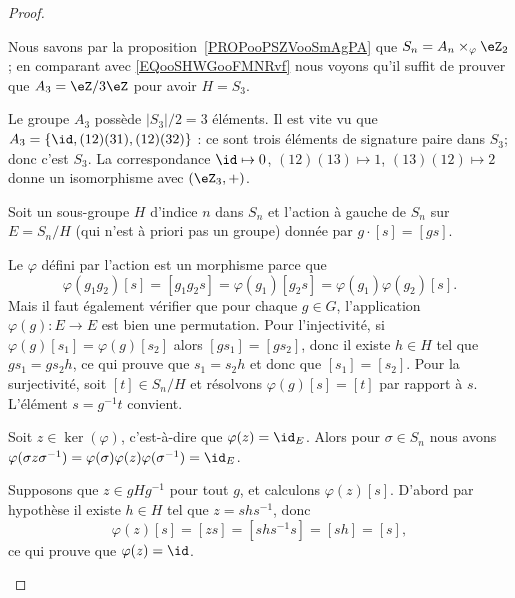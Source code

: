 \begin{proof}
\begin{subproof}
		Nous savons par la proposition~\ref{PROPooPSZVooSmAgPA} que \( S_n=A_n\times_{\varphi}\eZ_2\); en comparant avec \eqref{EQooSHWGooFMNRvf} nous voyons qu'il suffit de prouver que \( A_3=\eZ/3\eZ\) pour avoir \( H=S_3\).

		Le groupe \( A_3\) possède \( | S_3 |/2=3\) éléments. Il est vite vu que \( A_3=\{ \id,(12)(31), (12)(32) \}\) : ce sont trois éléments de signature paire dans \( S_3\); donc c'est \( S_3\). La correspondance \( \id\mapsto 0\), \( (12)(13)\mapsto 1\), \( (13)(12)\mapsto 2\) donne un isomorphisme avec \( (\eZ_3,+)\).


		Soit un sous-groupe \( H\) d'indice \( n\) dans \( S_n\) et l'action à gauche de \( S_n\) sur \( E=S_n/H\) (qui n'est à priori pas un groupe) donnée par \( g\cdot [s]=[gs]\).

		\begin{subproof}

			Le \( \varphi\) défini par l'action est un morphisme parce que
			\begin{equation}
				\varphi(g_1g_2)[s]=[g_1g_2s]=\varphi(g_1)[g_2s]=\varphi(g_1)\varphi(g_2)[s].
			\end{equation}
			Mais il faut également vérifier que pour chaque \( g\in G\), l'application \( \varphi(g)\colon E\to E\) est bien une permutation. Pour l'injectivité, si \( \varphi(g)[s_1]=\varphi(g)[s_2]\) alors \( [gs_1]=[gs_2]\), donc il existe \( h\in H\) tel que \( gs_1=gs_2h\), ce qui prouve que \( s_1=s_2h\) et donc que \( [s_1]=[s_2]\). Pour la surjectivité, soit \( [t]\in S_n/H\) et résolvons \( \varphi(g)[s]=[t]\) par rapport à \( s\). L'élément \( s=g^{-1} t\) convient.


			Soit \( z\in\ker(\varphi)\), c'est-à-dire que \( \varphi(z)=\id_E\). Alors pour \( \sigma\in S_n\) nous avons \( \varphi(\sigma z\sigma^{-1})=\varphi(\sigma)\varphi(z)\varphi(\sigma^{-1})=\id_E\).

			\spitem[\( \ker(\varphi)=\bigcap_{g\in S_n}gHg^{-1}\)]

			Supposons que \( z\in gHg^{-1}\) pour tout \( g\), et calculons \( \varphi(z)[s]\). D'abord par hypothèse il existe \( h\in H\) tel que \( z=shs^{-1}\), donc
			\begin{equation}
				\varphi(z)[s]=[zs]=[shs^{-1}s]=[sh]=[s],
			\end{equation}
			ce qui prouve que \( \varphi(z)=\id\).


\end{subproof}
\end{subproof}
\end{proof}
